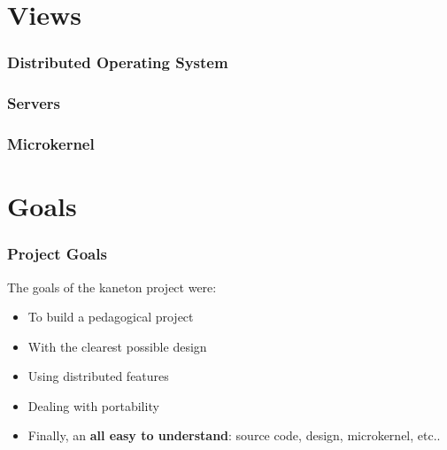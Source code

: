 %
%

\section{Views}


\begin{frame}
  \frametitle{Distributed Operating System}

  \begin{center}
  \end{center}
\end{frame}


\begin{frame}
  \frametitle{Servers}

  \begin{center}
  \end{center}
\end{frame}


\begin{frame}
  \frametitle{Microkernel}

  \begin{center}
  \end{center}
\end{frame}

%
%

\section{Goals}


\begin{frame}
  \frametitle{Project Goals}

  The goals of the kaneton project were:

  \begin{itemize}[<+->]
    \item
      To build a pedagogical project
    \item
      With the clearest possible design
    \item
      Using distributed features
    \item
      Dealing with portability
    \item
      Finally, an \textbf{all easy to understand}:
      source code, design, microkernel, etc..
  \end{itemize}
\end{frame}

